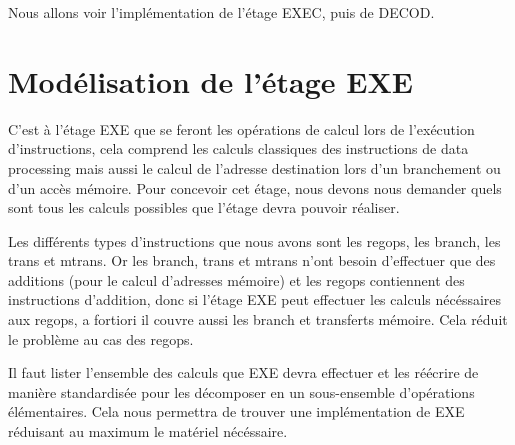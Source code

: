 \documentclass{article}
\begin{document}
Nous allons voir l'implémentation de l'étage EXEC, puis de DECOD.

\section{Modélisation de l'étage EXE}

\par
C'est à l'étage EXE que se feront les opérations de calcul lors de l'exécution d'instructions,
cela comprend les calculs classiques des instructions de data processing mais aussi le calcul de
l'adresse destination lors d'un branchement ou d'un accès mémoire.
Pour concevoir cet étage, nous devons nous demander quels sont tous les calculs possibles
que l'étage devra pouvoir réaliser.

\par
Les différents types d'instructions que nous avons sont les regops, les branch, les trans et mtrans.
Or les branch, trans et mtrans n'ont besoin d'effectuer que des additions (pour le calcul d'adresses
mémoire) et les regops contiennent des instructions d'addition, donc si l'étage EXE peut effectuer
les calculs nécéssaires aux regops, a fortiori il couvre aussi les branch et transferts mémoire.
Cela réduit le problème au cas des regops.

\par
Il faut lister l'ensemble des calculs que EXE devra effectuer et les réécrire
de manière standardisée pour les décomposer en un sous-ensemble d'opérations élémentaires.
Cela nous permettra de trouver une implémentation de EXE réduisant au maximum le matériel nécéssaire.
\end{document}
